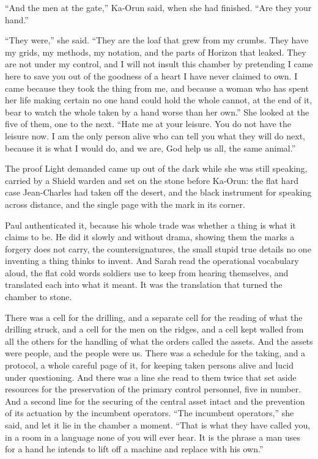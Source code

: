 ``And the men at the gate,'' Ka-Orun said, when she had finished. ``Are they your hand.''\par

``They were,'' she said. ``They are the loaf that grew from my crumbs. They have my grids, my methods, my notation, and the parts of Horizon that leaked. They are not under my control, and I will not insult this chamber by pretending I came here to save you out of the goodness of a heart I have never claimed to own. I came because they took the thing from me, and because a woman who has spent her life making certain no one hand could hold the whole cannot, at the end of it, bear to watch the whole taken by a hand worse than her own.'' She looked at the five of them, one to the next. ``Hate me at your leisure. You do not have the leisure now. I am the only person alive who can tell you what they will do next, because it is what I would do, and we are, God help us all, the same animal.''\par

\ornament

The proof Light demanded came up out of the dark while she was still speaking, carried by a Shield warden and set on the stone before Ka-Orun: the flat hard case Jean-Charles had taken off the desert, and the black instrument for speaking across distance, and the single page with the mark in its corner.\par

Paul authenticated it, because his whole trade was whether a thing is what it claims to be. He did it slowly and without drama, showing them the marks a forgery does not carry, the countersignatures, the small stupid true details no one inventing a thing thinks to invent. And Sarah read the operational vocabulary aloud, the flat cold words soldiers use to keep from hearing themselves, and translated each into what it meant. It was the translation that turned the chamber to stone.\par

There was a cell for the drilling, and a separate cell for the reading of what the drilling struck, and a cell for the men on the ridges, and a cell kept walled from all the others for the handling of what the orders called the assets. And the assets were people, and the people were us. There was a schedule for the taking, and a protocol, a whole careful page of it, for keeping taken persons alive and lucid under questioning. And there was a line she read to them twice that set aside resources for the preservation of the primary control personnel, five in number. And a second line for the securing of the central asset intact and the prevention of its actuation by the incumbent operators. ``The incumbent operators,'' she said, and let it lie in the chamber a moment. ``That is what they have called you, in a room in a language none of you will ever hear. It is the phrase a man uses for a hand he intends to lift off a machine and replace with his own.''\par

